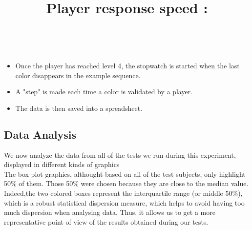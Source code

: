 \documentclass[12pt, openany, twocolumn]{article}
\begin{document}
                \title{Player response speed :}\\
                    \begin{itemize}
                        \item{Once the player has reached level 4, the stopwatch is started when the last color disappears in the example sequence.} \\
                        \item{A "step" is made each time a color is validated by a player.} \\
                        \item{The data is then saved into a spreadsheet.} \\  
                    \end{itemize}


    


    \subsection{Data Analysis\label{data}}
    
    We now analyze the data from all of the tests we run during this experiment, displayed in different kinds of graphics \\
    The box plot graphics, althought based on all of the test subjects, only highlight 50\% of them. Those 50\% were chosen because they are close to the median value. \\   
    Indeed,the two colored boxes represent the interquartile range (or middle 50\%), which is a robust statistical dispersion measure, which helps to avoid having too much dispersion when analysing data. Thus, it allows us to get a more representative point of view of the results obtained during our tests. 
\end{document}
